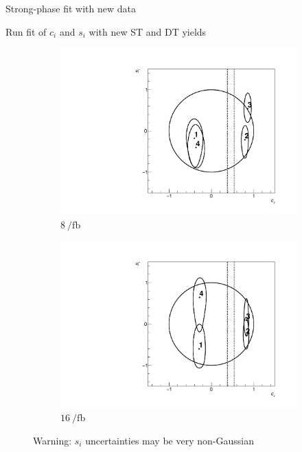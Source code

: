\documentclass{beamer}
\begin{document}
\begin{frame}{Strong-phase fit with new data}
  \begin{center}
    {\large Run fit of $c_i$ and $s_i$ with new ST and DT yields}
  \end{center}
  \vspace{-0.5cm}
  \begin{figure}
    \centering
    \begin{subfigure}{0.45\textwidth}
      \includegraphics[width = 1.0\textwidth]{Plots/Contours_cisi_8invfb.pdf}
      \caption{$\SI{8}{\per\femto\barn}$}
    \end{subfigure}%
    \hspace{1cm}
    \begin{subfigure}{0.45\textwidth}
      \includegraphics[width = 1.0\textwidth]{Plots/Contours_cisi_16invfb.pdf}
      \caption{$\SI{16}{\per\femto\barn}$}
    \end{subfigure}
    \caption{Warning: $s_i$ uncertainties may be very non-Gaussian}
  \end{figure}
\end{frame}
\end{document}
